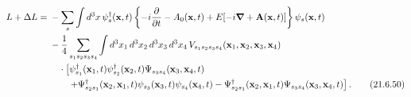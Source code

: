 \begin{align}
L+\Delta L
={}&-\sum_s\int d^3x\,
\psi_s^\dagger(\mathbf x,t)
\left\{
-i\frac{\partial}{\partial t}-A_0(\mathbf x,t)
+E[-i\boldsymbol\nabla+\mathbf A(\mathbf x,t)]
\right\}\psi_s(\mathbf x,t)
\notag\\
&-\frac14\sum_{s_1s_2s_3s_4}
\int d^3x_1\,d^3x_2\,d^3x_3\,d^3x_4\,
V_{s_1s_2s_3s_4}(\mathbf x_1,\mathbf x_2,\mathbf x_3,\mathbf x_4)
\notag\\
&\quad\cdot
\left[
\psi^\dagger_{s_1}(\mathbf x_1,t)
\psi^\dagger_{s_2}(\mathbf x_2,t)
\Psi_{s_3s_4}(\mathbf x_3,\mathbf x_4,t)
\right.
\notag\\
&\qquad\left.
+\Psi^\dagger_{s_2s_1}(\mathbf x_2,\mathbf x_1,t)
\psi_{s_3}(\mathbf x_3,t)
\psi_{s_4}(\mathbf x_4,t)
-\Psi^\dagger_{s_2s_1}(\mathbf x_2,\mathbf x_1,t)
\Psi_{s_3s_4}(\mathbf x_3,\mathbf x_4,t)
\right].
\tag{21.6.50}\label{eq:21.6.50}
\end{align}


